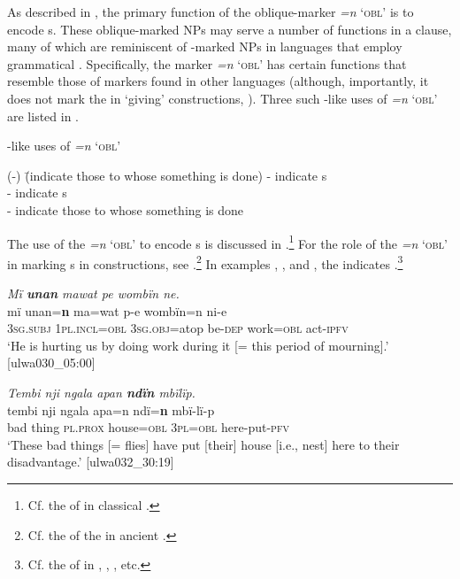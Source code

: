 As described in , the primary function of the oblique-marker  \textit{=n} ‘\textsc{obl}’ is to encode s. These oblique-marked NPs may serve a number of functions in a clause, many of which are reminiscent of -marked NPs in languages that employ grammatical . Specifically, the marker \textit{=n} ‘\textsc{obl}’ has certain functions that resemble those of  markers found in other languages (although, importantly, it does not mark the  in ‘giving’ constructions, ). Three such -like uses of \textit{=n} ‘\textsc{obl}’ are listed in .

\ea%
    \label{ex:clause:78a}
-like uses of \textit{=n} \textsc{‘obl’}
\begin{tabbing}
{(-)} \= {(indicate those to whose  something is done)}\kill
{-} \> {indicate s}\\
{-} \> {indicate s}\\
{-} \> {indicate those to whose  something is done}
\end{tabbing}
\z

The use of the  \textit{=n} ‘\textsc{obl}’ to encode s is discussed in .\footnote{Cf. the  of  in classical .} For the role of the  \textit{=n} ‘\textsc{obl}’ in marking s in  constructions, see .\footnote{Cf. the  of the  in ancient .} In examples , , and , the  indicates .\footnote{Cf. the  of  in , , , etc.}

\ea%
    \label{ex:clause:79}
          \textit{Mï \textbf{unan} mawat pe wombïn ne.}\\
\gll    mï      unan=\textbf{n}    ma=wat    p-e    wombïn=n  ni{}-e\\
    3\textsc{sg.subj}  \textsc{1pl.incl=obl}  \textsc{3sg.obj}=atop  be\textsc{{}-dep} work=\textsc{obl}  act-\textsc{ipfv}\\
\glt `He is hurting us by doing work during it [= this period of mourning].’ [ulwa030\_05:00]
\z

\ea%
    \label{ex:clause:80}
          \textit{Tembi nji ngala apan \textbf{ndïn} mbïlïp.}\\
\gll    tembi  nji    ngala    apa=n      ndï=\textbf{n}    mbï-lï-p\\
    bad    thing  \textsc{pl.prox}  house=\textsc{obl}  3\textsc{pl=obl}  here-put-\textsc{pfv}\\
\glt `These bad things [= flies] have put [their] house [i.e., nest] here to their disadvantage.’ [ulwa032\_30:19]
\z


